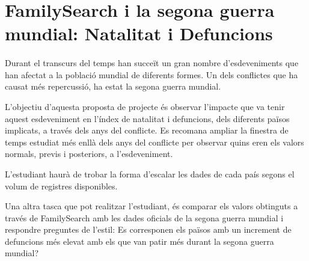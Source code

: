 \section{FamilySearch i la segona guerra mundial: Natalitat i Defuncions}

    \paragraph{}
    Durant el transcurs del temps han succeït un gran nombre d'esdeveniments que han afectat a la població mundial de diferents formes. Un dels conflictes que ha causat més repercussió, ha estat la segona guerra mundial.

    L'objectiu d'aquesta proposta de projecte és observar l'impacte que va tenir aquest esdeveniment en l'índex de natalitat i defuncions, dels diferents països implicats, a través dels anys del conflicte. Es recomana ampliar la finestra de temps estudiat més enllà dels anys del conflicte per observar quins eren els valors normals, previs i posteriors, a l'esdeveniment.

    L'estudiant haurà de trobar la forma d'escalar les dades de cada país segons el volum de registres disponibles.

    Una altra tasca que pot realitzar l'estudiant, és comparar els valors obtinguts a través de FamilySearch amb les dades oficials de la segona guerra mundial i respondre preguntes de l'estil: Es corresponen els països amb un increment de defuncions més elevat amb els que van patir més durant la segona guerra mundial?
